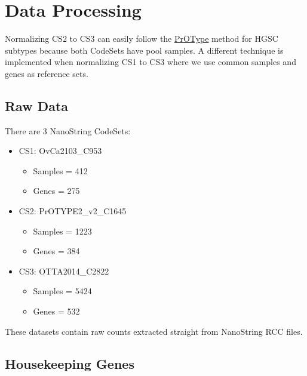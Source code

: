 \documentclass[
]{report}
\providecommand{\tightlist}{%
  \setlength{\itemsep}{0pt}\setlength{\parskip}{0pt}}
\begin{document}
\hypertarget{data-processing}{%
\section{Data Processing}\label{data-processing}}

Normalizing CS2 to CS3 can easily follow the \href{https://dchiu911.shinyapps.io/PrOType/}{PrOType} method for HGSC subtypes because both CodeSets have pool samples. A different technique is implemented when normalizing CS1 to CS3 where we use common samples and genes as reference sets.

\hypertarget{raw-data}{%
\subsection{Raw Data}\label{raw-data}}

There are 3 NanoString CodeSets:

\begin{itemize}
\tightlist
\item
  CS1: OvCa2103\_C953

  \begin{itemize}
  \tightlist
  \item
    Samples = 412
  \item
    Genes = 275
  \end{itemize}
\item
  CS2: PrOTYPE2\_v2\_C1645

  \begin{itemize}
  \tightlist
  \item
    Samples = 1223
  \item
    Genes = 384
  \end{itemize}
\item
  CS3: OTTA2014\_C2822

  \begin{itemize}
  \tightlist
  \item
    Samples = 5424
  \item
    Genes = 532
  \end{itemize}
\end{itemize}

These datasets contain raw counts extracted straight from NanoString RCC files.

\hypertarget{housekeeping-genes}{%
\subsection{Housekeeping Genes}\label{housekeeping-genes}}
\end{document}
